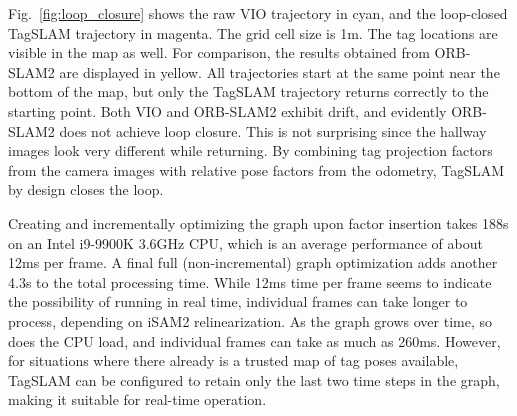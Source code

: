 Fig.\ \ref{fig:loop_closure} shows the raw VIO trajectory in cyan, and
the loop-closed TagSLAM trajectory in magenta. The grid cell size is
1m. The tag locations are visible in the map as well. For comparison,
the results obtained from ORB-SLAM2 \cite{murartal2016} are displayed
in yellow. All trajectories start at the same point near the bottom of
the map, but only the TagSLAM trajectory returns correctly to the
starting point. Both VIO and ORB-SLAM2 exhibit drift, and evidently
ORB-SLAM2 does not achieve loop closure. This is not surprising since
the hallway images look very different while returning.  By combining
tag projection factors from the camera images with relative pose
factors from the odometry, TagSLAM by design closes the loop.

Creating and incrementally optimizing the graph upon factor insertion
takes 188s on an Intel i9-9900K 3.6GHz CPU, which is an average
performance of about 12ms per frame. A final full (non-incremental)
graph optimization adds another 4.3s to the total processing
time. While 12ms time per frame seems to indicate the possibility of
running in real time, individual frames can take longer to process,
depending on iSAM2 relinearization. As the graph grows over time, so
does the CPU load, and individual frames can take as much as
260ms. However, for situations where there already is a trusted map of
tag poses available, TagSLAM can be configured to retain only the last
two time steps in the graph, making it suitable for real-time
operation.
